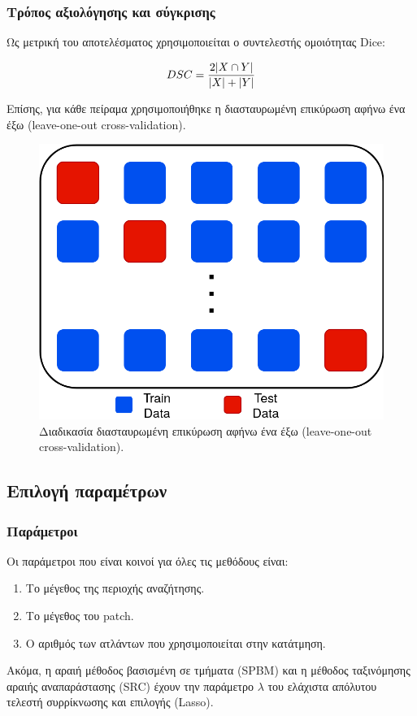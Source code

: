 \documentclass{beamer}
\DeclarePairedDelimiter\abs{\lvert}{\rvert}
\begin{document}
\begin{frame}
\frametitle{Τρόπος αξιολόγησης και σύγκρισης}

Ως μετρική του αποτελέσματος χρησιμοποιείται ο συντελεστής ομοιότητας Dice: 

\begin{equation*}
    DSC = \frac{2 \abs{X \cap Y}} {\abs{X} + \abs{Y}}
\end{equation*}

Επίσης, για κάθε πείραμα χρησιμοποιήθηκε η διασταυρωμένη επικύρωση αφήνω ένα έξω
(leave-one-out cross-validation).  

\begin{figure}[H]
    \centering
    \includegraphics[height=0.4\textheight]{leave_one_out}
    \caption{Διαδικασία διασταυρωμένη επικύρωση αφήνω ένα έξω (leave-one-out
             cross-validation).}
\end{figure}

\end{frame}


\subsection{Επιλογή παραμέτρων}

\begin{frame}
\frametitle{Παράμετροι}
Οι παράμετροι που είναι κοινοί για όλες τις μεθόδους είναι:

\begin{enumerate}
    \item Το μέγεθος της περιοχής αναζήτησης.
    \item Το μέγεθος του patch.
    \item Ο αριθμός των ατλάντων που χρησιμοποιείται στην κατάτμηση.
\end{enumerate}

Ακόμα, η αραιή μέθοδος βασισμένη σε τμήματα (SPBM) και η μέθοδος
ταξινόμησης αραιής αναπαράστασης (SRC) έχουν την παράμετρο $\lambda$ του
ελάχιστα απόλυτου τελεστή συρρίκνωσης και επιλογής (Lasso).
\end{frame}
\end{document}
